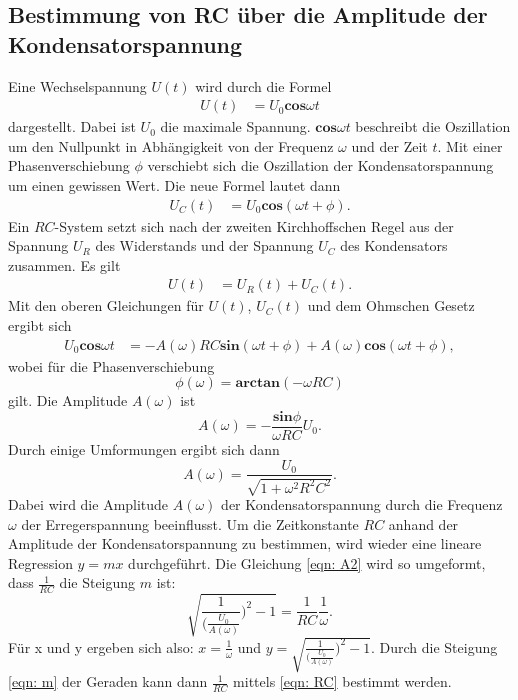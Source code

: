 \subsection{Bestimmung von RC über die Amplitude der Kondensatorspannung}
Eine Wechselspannung $U(t)$ wird durch die Formel 
\begin{align*} 
    U(t)&= U_{0} \mathbf{cos}\omega t 
\end{align*}
dargestellt. Dabei ist $U_{0}$ die maximale Spannung. $\mathbf{cos}\omega t$ beschreibt die Oszillation um den Nullpunkt in Abhängigkeit von der Frequenz $\omega$ und der Zeit $t$. 
Mit einer Phasenverschiebung $\phi$ verschiebt sich die Oszillation der Kondensatorspannung um einen gewissen Wert. Die neue Formel lautet dann 
\begin{align*} 
    U_{C}(t)&= U_{0} \mathbf{cos}(\omega t + \phi).
\end{align*}
Ein $RC$-System setzt sich nach der zweiten Kirchhoffschen Regel aus der Spannung $U_{R}$ des Widerstands und der Spannung $U_{C}$ des Kondensators zusammen.
Es gilt 
\begin{align*} 
    U(t) &= U_{R}(t) + U_{C}(t).
\end{align*}
Mit den oberen Gleichungen für $U(t)$, $U_{C}(t)$ und dem Ohmschen Gesetz ergibt sich 
\begin{align*} 
U_{0} \mathbf{cos}\omega t &= -A(\omega) RC \mathbf{sin}(\omega t + \phi) + A(\omega) \mathbf{cos}(\omega t + \phi),  
\end{align*}
wobei für die Phasenverschiebung 
\begin{equation} 
\phi (\omega) = \mathbf{arctan}(-\omega RC) 
\label{eqn: phi}
\end{equation}
gilt. Die Amplitude $A(\omega)$ ist
\begin{equation} 
    A(\omega) = - \frac{\mathbf{sin}\phi}{\omega RC} U_{0}.
    \label{eqn: A1}
\end{equation}
Durch einige Umformungen ergibt sich dann 
\begin{equation}
A(\omega) = \frac{U_{0}}{\sqrt{1 + \omega^2 R^2 C^2}}.
\label{eqn: A2}
\end{equation}
Dabei wird die Amplitude $A(\omega)$ der Kondensatorspannung durch die Frequenz $\omega$ der Erregerspannung beeinflusst.
Um die Zeitkonstante $RC$ anhand der Amplitude der Kondensatorspannung zu bestimmen, wird wieder eine lineare Regression $y=mx$ durchgeführt. %
Die Gleichung \eqref{eqn: A2} wird so umgeformt, dass $\frac{1}{RC}$ die Steigung $m$ ist:
\begin{equation}
    \sqrt{\frac{1}{(\frac{U_{0}}{A(\omega)}})^2 -1} = \frac{1}{RC} \frac{1}{\omega}.
    \label{eqn: linreg2}
\end{equation}
Für x und y ergeben sich also: $x=\frac{1}{\omega}$ und $y=\sqrt{\frac{1}{(\frac{U_{0}}{A(\omega)}})^2 -1}$. %
Durch die Steigung \eqref{eqn: m} der Geraden kann dann $\frac{1}{RC}$ mittels \eqref{eqn: RC} bestimmt werden.

